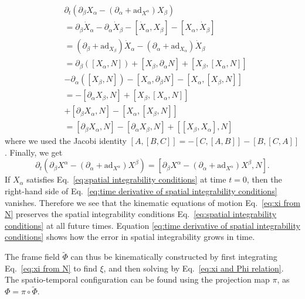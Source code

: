\begin{equation}
\begin{aligned}
& \partial_t \left( \partial_\beta X_\alpha - ( \partial_\alpha + \text{ad}_{X^\alpha}) X_\beta \right) \\
&  =  \partial_\beta \dot{X}_\alpha - \partial_\alpha \dot{X}_\beta - [\dot{X}_\alpha, X_\beta] - [X_\alpha, \dot{X}_\beta] \\
& = (\partial_\beta + \text{ad}_{X_\beta}) \dot{X}_\alpha - (\partial_\alpha + \text{ad}_{X_\alpha}) \dot{X}_\beta \\
& = \partial_\beta( [X_\alpha, N]) + [X_\beta, \partial_\alpha N] + [X_\beta, [X_\alpha, N]] \\
& -   \partial_\alpha( [X_\beta, N]) - [X_\alpha, \partial_\beta N] - [X_\alpha, [X_\beta, N]] \\
& = - [ \partial_\alpha X_\beta, N] + [X_\beta, [X_\alpha, N]] \\
& +  [\partial_\beta X_\alpha,  N] - [X_\alpha, [X_\beta, N]] \\ 
& = [\partial_\beta X_\alpha,  N] - [ \partial_\alpha X_\beta, N] + [[X_\beta, X_\alpha], N]
\end{aligned}
\end{equation}
where we used the Jacobi identity $[A,[B,C]] = -[C, [A, B]] - [B, [C, A]]$. Finally, we get
\begin{equation} \label{eq:time derivative of spatial integrability conditions}
\partial_t \left( \partial_\beta X^\alpha - ( \partial_\alpha + \text{ad}_{X^\alpha}) X^\beta \right) = [ \partial_\beta X^\alpha - ( \partial_\alpha + \text{ad}_{X^\alpha}) X^\beta, N].
\end{equation}
If $X_\alpha$ satisfies Eq.~\ref{eq:spatial integrability conditions} at time $t=0$, then the right-hand side of Eq.~\ref{eq:time derivative of spatial integrability conditions} vanishes. Therefore we see that the kinematic equations of motion Eq.~\ref{eq:xi from N} preserves the spatial integrability conditions Eq.~\ref{eq:spatial integrability conditions} at all future times. Equation \ref{eq:time derivative of spatial integrability conditions} shows how the error in spatial integrability grows in time.

The frame field $\tilde{\Phi}$ can thus be kinematically constructed by first integrating Eq.~\ref{eq:xi from N} to find $\xi$, and then solving by Eq.~\ref{eq:xi and Phi relation}. The spatio-temporal configuration can be found using the projection map $\pi$, as $\Phi = \pi \circ \tilde{\Phi}$.

